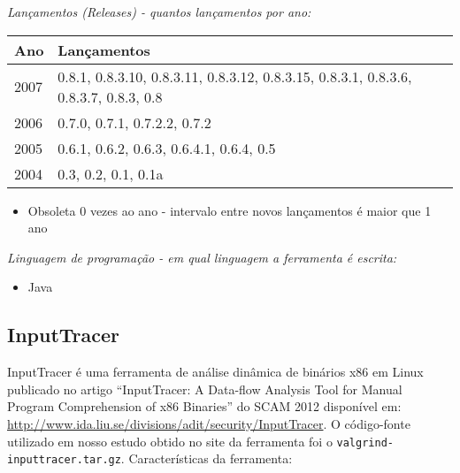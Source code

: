 \begin{description}

  \item {\it Lançamentos ({\it Releases}) - quantos lançamentos por ano:}
    \begin{table}[h!]
      \centering
      \begin{tabular}{| l | l |}
        \hline
        Ano  & Lançamentos                              \\
        \hline
        2007 & 0.8.1, 0.8.3.10, 0.8.3.11, 0.8.3.12, 0.8.3.15, 0.8.3.1, 0.8.3.6, 0.8.3.7, 0.8.3, 0.8 \\
        2006 & 0.7.0, 0.7.1, 0.7.2.2, 0.7.2             \\
        2005 & 0.6.1, 0.6.2, 0.6.3, 0.6.4.1, 0.6.4, 0.5 \\
        2004 & 0.3, 0.2, 0.1, 0.1a                      \\
        \hline
      \end{tabular}
    \end{table}
    \begin{itemize}
      \item Obsoleta $0$ vezes ao ano - intervalo entre novos lançamentos é maior que 1 ano
    \end{itemize}

  \item {\it Linguagem de programação - em qual linguagem a ferramenta é escrita:}
    \begin{itemize}
      \item Java
    \end{itemize}

\end{description}

\subsection{InputTracer}

InputTracer é uma ferramenta de análise dinâmica de binários x86 em Linux
publicado no artigo ``InputTracer: A Data-flow Analysis Tool for Manual
Program Comprehension of x86 Binaries'' do SCAM 2012 disponível em:
\url{http://www.ida.liu.se/divisions/adit/security/InputTracer}. O
código-fonte utilizado em nosso estudo obtido no site da ferramenta foi o
\texttt{valgrind-inputtracer.tar.gz}.  Características da ferramenta:

